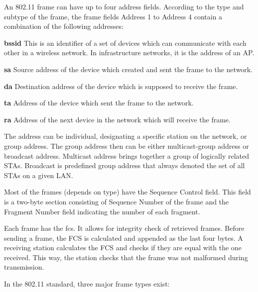 An 802.11 frame can have up to four address fields. According to the type and subtype of the frame, the frame fields Address 1 to Address 4 contain a combination of the following addresses:

\begin{description}
\item \textbf{\gls{bssid}} This is an identifier of a set of devices which can communicate with each other in a wireless network. In infrastructure networks, it is the address of an AP. 
\item \textbf{\gls{sa}} Source address of the device which created and sent the frame to the network. 
\item \textbf{\gls{da}} Destination address of the device which is supposed to receive the frame.
\item \textbf{\gls{ta}} Address of the device which sent the frame to the network.
\item \textbf{\gls{ra}} Address of the next device in the network which will receive the frame.
\end{description}

The address can be individual, designating a specific station on the network, or group address. The group address then can be either multicast-group address or broadcast address. Multicast address brings together a group of logically related STAs. Broadcast is predefined group address that always denoted the set of all STAs on a given LAN. 

Most of the frames (depends on type) have the Sequence Control field. This field is a two-byte section consisting of Sequence Number of the frame and the Fragment Number field indicating the number of each fragment.

Each frame has the \gls{fcs}. It allows for integrity check of retrieved frames. Before sending a frame, the FCS is calculated and appended as the last four bytes. A receiving station calculates the FCS and checks if they are equal with the one received. This way, the station checks that the frame was not malformed during transmission.

In the 802.11 standard, three major frame types exist: 

